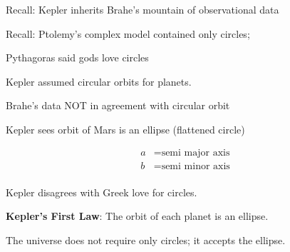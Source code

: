 \documentclass{article}
\begin{document}
Recall: Kepler inherits Brahe's mountain of observational data

Recall: Ptolemy's complex model contained only circles; 

Pythagoras said gods love circles

Kepler assumed circular orbits for planets. 

Brahe's data NOT in agreement with circular orbit

Kepler sees orbit of Mars is an ellipse (flattened circle)

\begin{figure}[h!]
    \centering

\end{figure}
\vspace{-1cm}

\begin{align*}
    a &= \text{semi major axis}\\
    b &= \text{semi minor axis}\\
\end{align*}

Kepler disagrees with Greek love for circles.

\begin{mdframed}[backgroundcolor=black!10]
    \textbf{Kepler’s First Law}: The orbit of each planet is an ellipse.
\end{mdframed}

The universe does not require only circles; it accepts the ellipse. 
\end{document}
